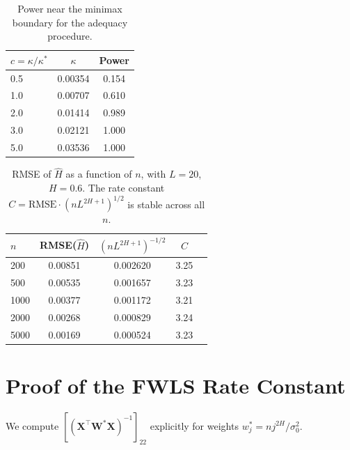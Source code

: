 \documentclass[10pt,a4paper,twocolumn]{article}
\newcommand{\Hhat}{\widehat{H}}
\begin{document}
\begin{table}[h]
\centering
\caption{Power near the minimax boundary for the adequacy procedure.}
\label{tab:power-boundary}
\begin{tabular}{lcc}
\toprule
$c = \kappa/\kappa^*$ & $\kappa$ & Power \\
\midrule
0.5 & 0.00354 & 0.154 \\
1.0 & 0.00707 & 0.610 \\
2.0 & 0.01414 & 0.989 \\
3.0 & 0.02121 & 1.000 \\
5.0 & 0.03536 & 1.000 \\
\bottomrule
\end{tabular}
\end{table}

\begin{table}[h]
\centering
\caption{RMSE of $\Hhat$ as a function of $n$, with $L=20$, $H=0.6$.
The rate constant $C = \mathrm{RMSE} \cdot (n L^{2H+1})^{1/2}$ is
stable across all $n$.}
\label{tab:rate}
\begin{tabular}{lcccc}
\toprule
$n$ & RMSE($\Hhat$) & $(nL^{2H+1})^{-1/2}$ & $C$ \\
\midrule
200  & 0.00851 & 0.002620 & 3.25 \\
500  & 0.00535 & 0.001657 & 3.23 \\
1000 & 0.00377 & 0.001172 & 3.21 \\
2000 & 0.00268 & 0.000829 & 3.24 \\
5000 & 0.00169 & 0.000524 & 3.23 \\
\bottomrule
\end{tabular}
\end{table}




\section{Proof of the FWLS Rate Constant}
\label{app:rate-constant}

We compute $[(\mathbf{X}^\top \mathbf{W}^* \mathbf{X})^{-1}]_{22}$
explicitly for weights $w_j^* = n j^{2H}/\sigma_0^2$.
\end{document}
